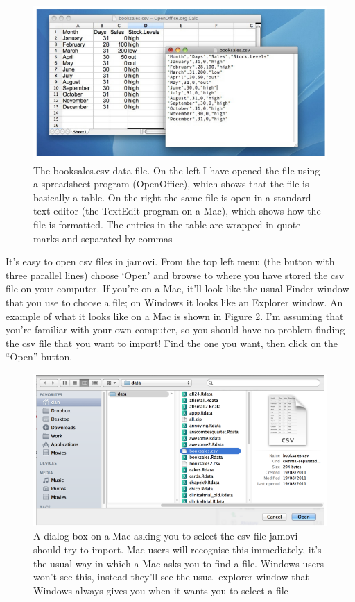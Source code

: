 \documentclass[
]{book}
\begin{document}
\begin{figure}
\includegraphics[width=0.9\linewidth]{images/Figure5} \caption{The booksales.csv data file. On the left I have opened the file using a spreadsheet program (OpenOffice), which shows that the file is basically a table. On the right the same file is open in a standard text editor (the TextEdit program on a Mac), which shows how the file is formatted. The entries in the table are wrapped in quote marks and separated by commas}\label{fig:fig3-4}
\end{figure}

It's easy to open csv files in jamovi. From the top left menu (the button with three parallel lines) choose `Open' and browse to where you have stored the csv file on your computer. If you're on a Mac, it'll look like the usual Finder window that you use to choose a file; on Windows it looks like an Explorer window. An example of what it looks like on a Mac is shown in Figure \ref{fig:fig3-5}. I'm assuming that you're familiar with your own computer, so you should have no problem finding the csv file that you want to import! Find the one you want, then click on the ``Open'' button.

\begin{figure}
\includegraphics[width=0.9\linewidth]{images/Figure6} \caption{A dialog box on a Mac asking you to select the csv file jamovi should try to import. Mac users will recognise this immediately, it's the usual way in which a Mac asks you to find a file. Windows users won't see this, instead they'll see the usual explorer window that Windows always gives you when it wants you to select a file}\label{fig:fig3-5}
\end{figure}
\end{document}
